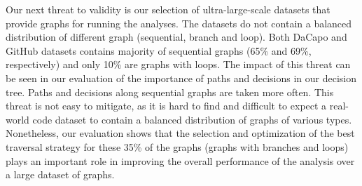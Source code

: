 Our next threat to validity is our selection of ultra-large-scale datasets that
provide graphs for running the analyses. The datasets do not contain a balanced
distribution of different graph \graphprop{} (sequential, branch and loop). Both
DaCapo and GitHub datasets contains majority of sequential graphs (65\% and
69\%, respectively) and only 10\% are graphs with loops. The impact of this
threat can be seen in our evaluation of the importance of paths and decisions in
our decision tree. Paths and decisions along sequential graphs are taken more
often. This threat is not easy to mitigate, as it is hard to find and difficult
to expect a real-world code dataset to contain a balanced distribution of graphs
of various types. Nonetheless, our evaluation shows that the selection and
optimization of the best traversal strategy for these 35\% of the graphs (graphs
with branches and loops) plays an important role in improving the overall
performance of the analysis over a large dataset of graphs.
